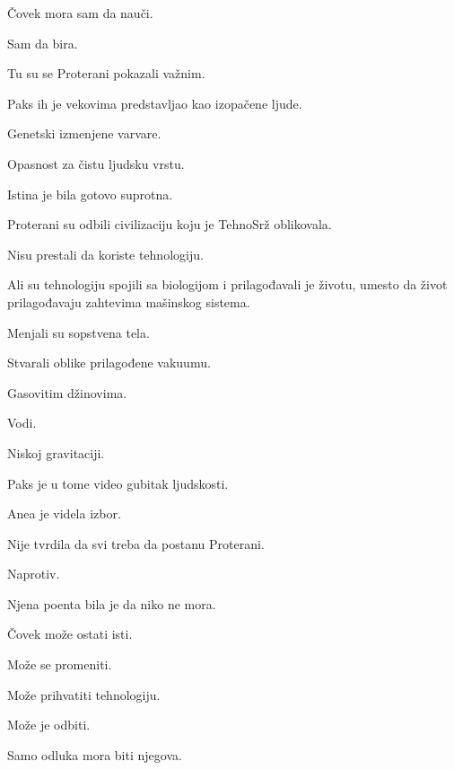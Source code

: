\bigskip

Čovek mora sam da nauči.

\bigskip

Sam da bira.

\bigskip

Tu su se Proterani pokazali važnim.

\bigskip

Paks ih je vekovima predstavljao kao izopačene ljude.

Genetski izmenjene varvare.

Opasnost za čistu ljudsku vrstu.

\bigskip

Istina je bila gotovo suprotna.

\bigskip

Proterani su odbili civilizaciju koju je TehnoSrž oblikovala.

\bigskip

Nisu prestali da koriste tehnologiju.

Ali su tehnologiju spojili sa biologijom i prilagođavali je životu, umesto da život prilagođavaju zahtevima mašinskog sistema.

\bigskip

Menjali su sopstvena tela.

Stvarali oblike prilagođene vakuumu.

Gasovitim džinovima.

Vodi.

Niskoj gravitaciji.

\bigskip

Paks je u tome video gubitak ljudskosti.

\bigskip

Anea je videla izbor.

\bigskip

Nije tvrdila da svi treba da postanu Proterani.

\bigskip

Naprotiv.

Njena poenta bila je da niko ne mora.

\bigskip

Čovek može ostati isti.

Može se promeniti.

Može prihvatiti tehnologiju.

Može je odbiti.

\bigskip

Samo odluka mora biti njegova.

\bigskip

